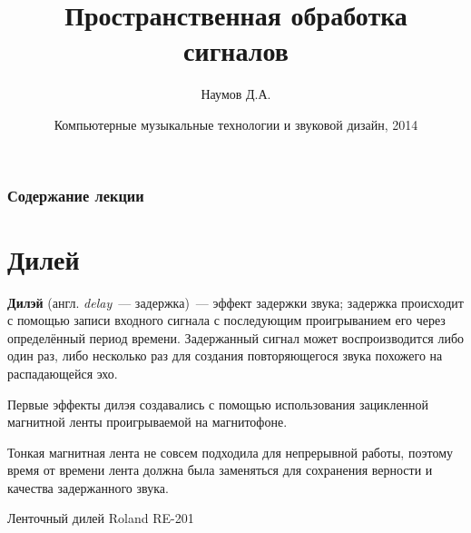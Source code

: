 \documentclass{beamer}
\title{Пространственная обработка сигналов}
\author{Наумов Д.А.}
\date[08.04.2014] {Компьютерные музыкальные технологии и звуковой дизайн, 2014}
\begin{document}
\begin{frame}
  \titlepage
\end{frame}

\begin{frame}
  \frametitle{Содержание лекции}
  \tableofcontents
\end{frame}

\section{Дилей}
\begin{frame}
  \textbf{Дилэй} (англ. \emph{delay}~--- задержка)~--- эффект задержки звука; задержка происходит с помощью записи входного сигнала с последующим проигрыванием его через определённый период времени. Задержанный сигнал может воспроизводится либо один раз, либо несколько раз для создания повторяющегося звука похожего на распадающейся эхо.


  Первые эффекты дилэя создавались с помощью использования зацикленной магнитной ленты проигрываемой на магнитофоне.
\end{frame}

\begin{frame}
  Тонкая магнитная лента не совсем подходила для непрерывной работы, поэтому время от времени лента должна была заменяться для сохранения верности и качества задержанного звука.

  \begin{block}{Ленточный дилей Roland RE-201}
  \end{block}
\end{frame}
\end{document}
